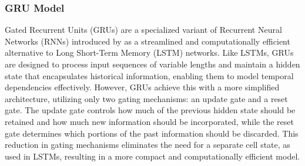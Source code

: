 \documentclass{dsfe}
\begin{document}
\subsubsection{GRU Model}
Gated Recurrent Units (GRUs) are a specialized variant of Recurrent Neural Networks (RNNs) introduced by \citep{chao2014} as a streamlined and computationally efficient alternative to Long Short-Term Memory (LSTM) networks. Like LSTMs, GRUs are designed to process input sequences of variable lengths and maintain a hidden state that encapsulates historical information, enabling them to model temporal dependencies effectively. However, GRUs achieve this with a more simplified architecture, utilizing only two gating mechanisms: an update gate and a reset gate. The update gate controls how much of the previous hidden state should be retained and how much new information should be incorporated, while the reset gate determines which portions of the past information should be discarded. This reduction in gating mechanisms eliminates the need for a separate cell state, as used in LSTMs, resulting in a more compact and computationally efficient model.
\end{document}
